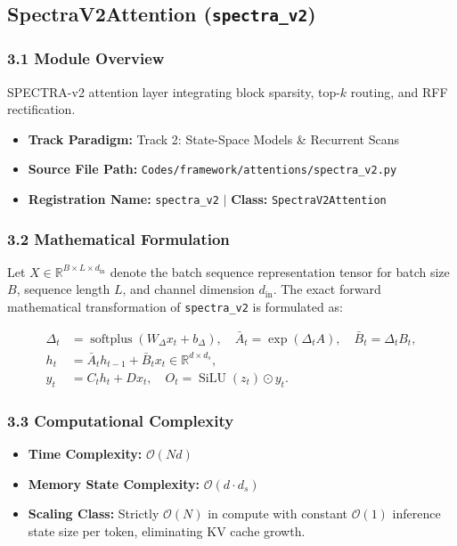 \subsection{SpectraV2Attention (\texttt{spectra\_v2})}
\label{sec:app_module_spectra_v2}

\subsubsection*{3.1 Module Overview}
SPECTRA-v2 attention layer integrating block sparsity, top-$k$ routing, and RFF rectification.
\begin{itemize}
    \item \textbf{Track Paradigm:} Track 2: State-Space Models \& Recurrent Scans
    \item \textbf{Source File Path:} \texttt{Codes/framework/attentions/spectra\_v2.py}
    \item \textbf{Registration Name:} \texttt{spectra\_v2} $\mid$ \textbf{Class:} \texttt{SpectraV2Attention}
\end{itemize}

\subsubsection*{3.2 Mathematical Formulation}
Let $X \in \mathbb{R}^{B \times L \times d_{\text{in}}}$ denote the batch sequence representation tensor for batch size $B$, sequence length $L$, and channel dimension $d_{\text{in}}$. The exact forward mathematical transformation of \texttt{spectra\_v2} is formulated as:

\begin{align}
\Delta_t &= \operatorname{softplus}(W_\Delta x_t + b_\Delta), \quad \bar{A}_t = \exp(\Delta_t A), \quad \bar{B}_t = \Delta_t B_t, \\
h_t &= \bar{A}_t h_{t-1} + \bar{B}_t x_t \in \mathbb{R}^{d \times d_s}, \\
y_t &= C_t h_t + D x_t, \quad O_t = \operatorname{SiLU}(z_t) \odot y_t.
\end{align}


\subsubsection*{3.3 Computational Complexity}
\begin{itemize}
    \item \textbf{Time Complexity:} $\mathcal{O}(N d)$
    \item \textbf{Memory State Complexity:} $\mathcal{O}(d \cdot d_s)$
    \item \textbf{Scaling Class:} Strictly $\mathcal{O}(N)$ in compute with constant $\mathcal{O}(1)$ inference state size per token, eliminating KV cache growth.
\end{itemize}

